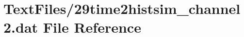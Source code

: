 \hypertarget{29time2histsim__channel2_8dat}{}\section{Text\+Files/29time2histsim\+\_\+channel2.dat File Reference}
\label{29time2histsim__channel2_8dat}
